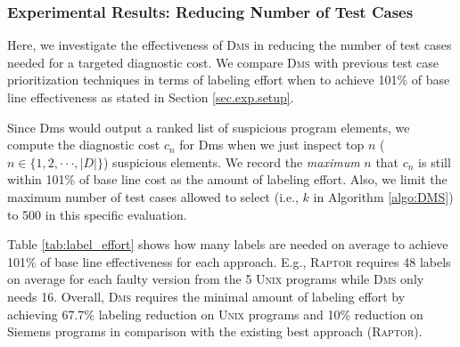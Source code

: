 \subsubsection{Experimental Results: Reducing Number of Test Cases}\label{sec.exp.resultsA}


Here, we investigate the effectiveness of \textsc{Dms} in reducing the number of test cases needed for a targeted diagnostic cost. We compare \textsc{Dms} with previous test case prioritization techniques in terms of labeling effort when to achieve 101\% of base line effectiveness as stated in Section \ref{sec.exp.setup}.


Since Dms would output a ranked list of suspicious program elements, we compute the diagnostic cost $c_n$ for {\sc Dms} when we just inspect top $n$ ($n \in \{1,2,\cdot \cdot \cdot, |D|\}$) suspicious elements. We record the {\em maximum} $n$ that $c_n$ is still within 101\% of base line cost as the amount of labeling effort. Also, we limit the maximum number of test cases allowed to select (i.e., $k$ in Algorithm \ref{algo:DMS}) to 500 in this specific evaluation.

Table \ref{tab:label_effort} shows how many labels are needed on average to achieve 101\% of base line effectiveness
for each approach.
E.g., \textsc{Raptor} requires 48 labels on average for each faulty version from the 5 \textsc{Unix} programs while \textsc{Dms} only needs 16.
Overall, \textsc{Dms} requires the minimal amount of labeling effort by achieving 67.7\% labeling reduction on \textsc{Unix}
programs and 10\% reduction on Siemens programs in comparison with the existing best approach (\textsc{Raptor}).

